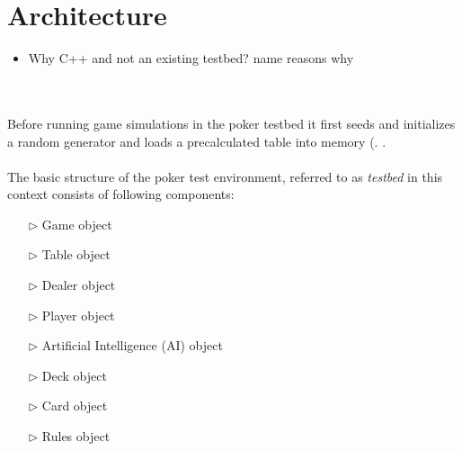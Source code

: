 \section{Architecture }
\label{sec:architecture}
\begin{itemize}
\item Why C++ and not an existing testbed?
\subitem name reasons why
\end{itemize}
\\\\
Before running game simulations in the poker testbed it first seeds and initializes a random generator  and loads a precalculated table into memory (. .\\\\
The basic structure of the poker test environment, referred to as \textit{testbed} in this context consists of following components:\\
\pagebreak
\begin{multicols}{2}
\begin{itemize}
\item[$\triangleright$] Game object
\item[$\triangleright$] Table object
\item[$\triangleright$] Dealer object
\item[$\triangleright$] Player object
\end{itemize}
\columnbreak
\begin{itemize}
\item[$\triangleright$] Artificial Intelligence (AI) object
\item[$\triangleright$] Deck object
\item[$\triangleright$] Card object
\item[$\triangleright$] Rules object
\end{itemize}
\end{multicols}


